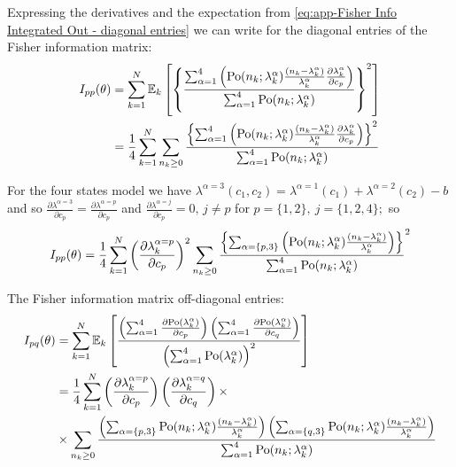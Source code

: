 Expressing the derivatives and the expectation from \autoref{eq:app-Fisher Info Integrated Out - diagonal entries} we can write for the diagonal entries of the Fisher information matrix:
%
\begin{alignat*}{2}
	I_{pp}(\theta) 
	& =\sum_{k=1}^N\mathbb{E}_k\left[\left\{ \frac{\sum_{\alpha=1}^4\left(\mathrm{Po}(n_k;\lambda_k^\alpha)\frac{(n_k-\lambda_k^\alpha)}{\lambda_k^\alpha}\frac{\partial\lambda_k^\alpha}{\partial c_p}\right)}{\sum_{\alpha=1}^4\mathrm{Po}(n_k;\lambda_k^\alpha)}\right\} ^2\right]\\
 	& =\frac{1}{4}\sum_{k=1}^N\sum_{n_k\geq0}\frac{\left\{ \sum_{\alpha=1}^4\left(\mathrm{Po}(n_k;\lambda_k^\alpha)\frac{(n_k-\lambda_k^\alpha)}{\lambda_k^\alpha}\frac{\partial\lambda_k^\alpha}{\partial c_p}\right)\right\} ^2}{\sum_{\alpha=1}^4\mathrm{Po}(n_k;\lambda_k^\alpha)}
\end{alignat*}

For the four states model we have $\lambda^{\alpha=3}(c_1,c_2)=\lambda^{\alpha=1}(c_1)+\lambda^{\alpha=2}(c_2)-b$ and so $\frac{\partial\lambda^{\alpha=3}}{\partial c_p}=\frac{\partial\lambda^{\alpha=p}}{\partial c_p}$ and $\frac{\partial\lambda^{\alpha=j}}{\partial c_p}=0,\, j\neq p$ for $p=\{1,2\},\: j=\{1,2,4\};$ so 
%
\begin{equation*}
	I_{pp}(\theta) 
	=\frac{1}{4}\sum_{k=1}^N\left(\frac{\partial\lambda_k^{\alpha=p}}{\partial c_p}\right)^2\sum_{n_k\geq0}\frac{\left\{\sum_{\alpha=\{p,3\}}\left(\mathrm{Po}(n_k;\lambda_k^\alpha)\frac{(n_k-\lambda_k^\alpha)}{\lambda_k^\alpha}\right)\right\}}{\sum_{\alpha=1}^4\mathrm{Po}(n_k;\lambda_k^\alpha)} ^2
\end{equation*}


The Fisher information matrix off-diagonal entries:
%
\begin{alignat*}{2}
	I_{pq}(\theta) 
	& =\sum_{k=1}^N\mathbb{E}_k\left[\frac{\left(\sum_{\alpha=1}^4\frac{\partial\mathrm{Po}(\lambda_k^\alpha)}{\partial c_p}\right)\left(\sum_{\alpha=1}^4\frac{\partial\mathrm{Po}(\lambda_k^\alpha)}{\partial c_q}\right)}{\left(\sum_{\alpha=1}^4\mathrm{Po}(\lambda_k^\alpha)\right)^2}\right]\nonumber \\
 	& =\frac{1}{4}\sum_{k=1}^N\left(\frac{\partial\lambda_k^{\alpha=p}}{\partial c_p}\right)\left(\frac{\partial\lambda_k^{\alpha=q}}{\partial c_q}\right)\times\\
	&\times\sum_{n_k\geq0}\frac{\left(\sum_{\alpha=\{p,3\}}\mathrm{Po}(n_k;\lambda_k^\alpha)\frac{(n_k-\lambda_k^\alpha)}{\lambda_k^\alpha}\right)\left(\sum_{\alpha=\{q,3\}}\mathrm{Po}(n_k;\lambda_k^\alpha)\frac{(n_k-\lambda_k^\alpha)}{\lambda_k^\alpha}\right)}{\sum_{\alpha=1}^4\mathrm{Po}(n_k;\lambda_k^\alpha)}
	\label{eq:app-Fisher Info Integrated Out-off diagonal entries}
\end{alignat*}

